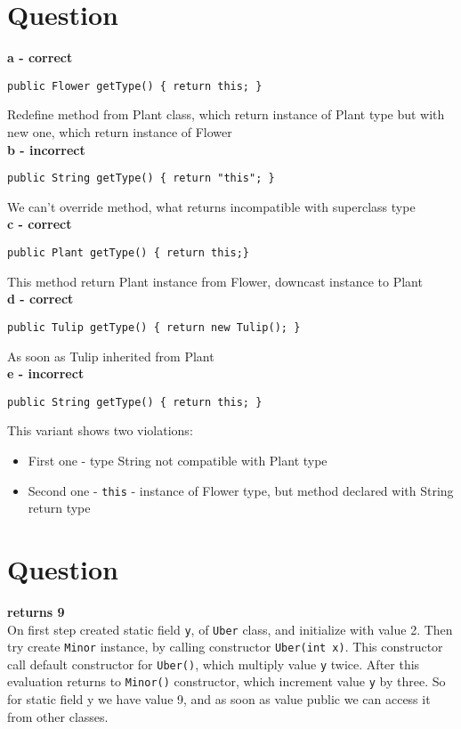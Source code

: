 \documentclass[a4paper,11pt]{article}
\begin{document}
\section{Question}

\textbf{a - correct}
\begin{lstlisting}
public Flower getType() { return this; }
\end{lstlisting}
Redefine method from Plant class, which return instance of Plant type but with new one, which return instance of Flower\\

\textbf{b - incorrect}
\begin{lstlisting}
public String getType() { return "this"; }
\end{lstlisting}
We can't override method, what returns incompatible with superclass type\\

\textbf{c - correct}
\begin{lstlisting}
public Plant getType() { return this;}
\end{lstlisting}
This method return Plant instance from Flower, downcast instance to Plant\\

\textbf{d - correct}
\begin{lstlisting}
public Tulip getType() { return new Tulip(); }
\end{lstlisting}
As soon as Tulip inherited from Plant\\

\textbf{e - incorrect}
\begin{lstlisting}
public String getType() { return this; }
\end{lstlisting}
This variant shows two violations:
\begin{itemize}
  \item
First one - type String not compatible with Plant type
  \item
Second one - \texttt{this} - instance of Flower type, but method declared with String return type
\end{itemize}

\section{Question}
\textbf{returns 9}\\
On first step created static field \texttt{y}, of \texttt{Uber} class, and initialize with value 2.
Then try create \texttt{Minor} instance, by calling constructor \texttt{Uber(int x)}.
This constructor call default constructor for \texttt{Uber()}, which multiply value \texttt{y} twice.
After this evaluation returns to \texttt{Minor()} constructor, which increment value \texttt{y} by three.
So for static field y we have value 9, and as soon as value public we can access it from other classes.
\newpage
\end{document}

